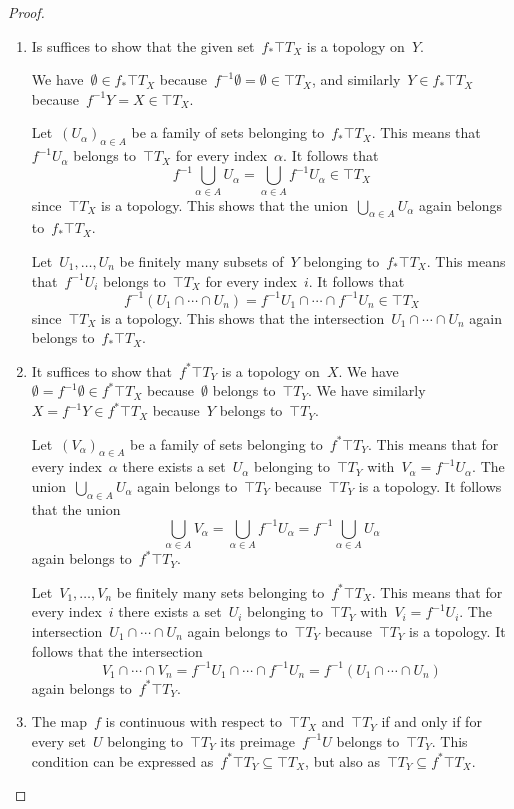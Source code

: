 \begin{proof}
	\leavevmode
	\begin{enumerate}

		\item
			Is suffices to show that the given set~$f_* \top{T}_X$ is a topology on~$Y$.

			We have~$∅ ∈ f_* \top{T}_X$ because~$f^{-1} ∅ = ∅ ∈ \top{T}_X$, and similarly~$Y ∈ f_* \top{T}_X$ because~$f^{-1} Y = X ∈ \top{T}_X$.

			Let~$(U_α)_{α ∈ A}$ be a family of sets belonging to~$f_* \top{T}_X$.
			This means that~$f^{-1} U_α$ belongs to~$\top{T}_X$ for every index~$α$.
			It follows that
			\[
				f^{-1} ⋃_{α ∈ A} U_α
				=
				⋃_{α ∈ A} f^{-1} U_α
				\in
				\top{T}_X
			\]
			since~$\top{T}_X$ is a topology.
			This shows that the union~$⋃_{α ∈ A} U_α$ again belongs to~$f_* \top{T}_X$.

			Let~$U_1, \dotsc, U_n$ be finitely many subsets of~$Y$ belonging to~$f_* \top{T}_X$.
			This means that~$f^{-1} U_i$ belongs to~$\top{T}_X$ for every index~$i$.
			It follows that
			\[
				f^{-1} (U_1 ∩ \dotsb ∩ U_n)
				=
				f^{-1} U_1 ∩ \dotsb ∩ f^{-1} U_n
				\in
				\top{T}_X
			\]
			since~$\top{T}_X$ is a topology.
			This shows that the intersection~$U_1 ∩ \dotsb ∩ U_n$ again belongs to~$f_* \top{T}_X$.

		\item
			It suffices to show that~$f^* \top{T}_Y$ is a topology on~$X$.
			We have~$∅ = f^{-1} ∅ ∈ f^* \top{T}_X$ because~$∅$ belongs to~$\top{T}_Y$.
			We have similarly~$X = f^{-1} Y ∈ f^* \top{T}_X$ because~$Y$ belongs to~$\top{T}_Y$.

			Let~$(V_α)_{α ∈ A}$ be a family of sets belonging to~$f^* \top{T}_Y$.
			This means that for every index~$α$ there exists a set~$U_α$ belonging to~$\top{T}_Y$ with~$V_α = f^{-1} U_α$.
			The union~$⋃_{α ∈ A} U_α$ again belongs to~$\top{T}_Y$ because~$\top{T}_Y$ is a topology.
			It follows that the union
			\[
				⋃_{α ∈ A} V_α
				=
				⋃_{α ∈ A} f^{-1} U_α
				=
				f^{-1} ⋃_{α ∈ A} U_α
			\]
			again belongs to~$f^* \top{T}_Y$.

			Let~$V_1, \dotsc, V_n$ be finitely many sets belonging to~$f^* \top{T}_X$.
			This means that for every index~$i$ there exists a set~$U_i$ belonging to~$\top{T}_Y$ with~$V_i = f^{-1} U_i$.
			The intersection~$U_1 ∩ \dotsb ∩ U_n$ again belongs to~$\top{T}_Y$ because~$\top{T}_Y$ is a topology.
			It follows that the intersection
			\[
				V_1 ∩ \dotsb ∩ V_n
				=
				f^{-1} U_1 ∩ \dotsb ∩ f^{-1} U_n
				=
				f^{-1} (U_1 ∩ \dotsb ∩ U_n)
			\]
			again belongs to~$f^* \top{T}_Y$.

		\item
			The map~$f$ is continuous with respect to~$\top{T}_X$ and~$\top{T}_Y$ if and only if for every set~$U$ belonging to~$\top{T}_Y$ its preimage~$f^{-1} U$ belongs to~$\top{T}_Y$.
			This condition can be expressed as~$f^* \top{T}_Y ⊆ \top{T}_X$, but also as~$\top{T}_Y ⊆ f^* \top{T}_X$.
		\qedhere

	\end{enumerate}
\end{proof}

